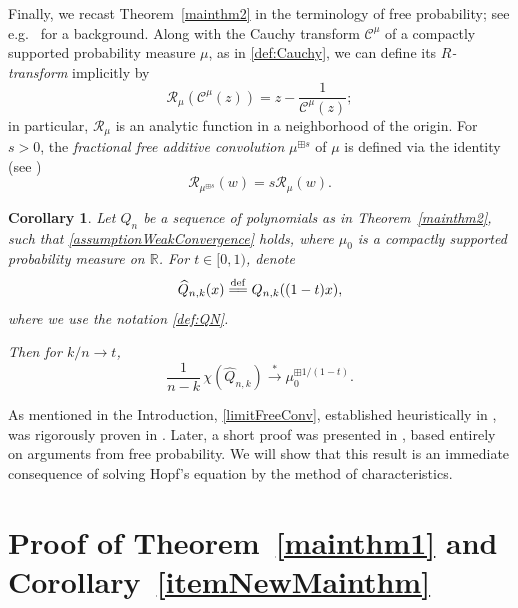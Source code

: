 \documentclass[reqno,11pt]{amsart}
\theoremstyle{plain}
\newtheorem{cor}[thm]{Corollary}
\theoremstyle{definition}
\theoremstyle{remark}
\numberwithin{equation}{section}
\numberwithin{equation}{section}
\newcommand{\R}{\mathbb{R}}
\newcommand{\isdef}{\overset{\mathrm{def}}{=\joinrel=}}
\begin{document}
Finally, we recast Theorem~\ref{mainthm2} in the terminology of free probability; see e.g.~\cite{Arizmendi21, MR4408504, MR3585560, MR2266879} for a background. Along with the Cauchy transform $\mathcal C^\mu$ of a compactly supported probability measure $\mu$, as in \eqref{def:Cauchy}, we can define its \textit{$R$-transform} implicitly by  
	\begin{equation}
	    \label{defRtransform}
 \mathcal R_\mu\left(\mathcal C^\mu(z)\right) = z-\frac{1}{\mathcal C^\mu(z)} ;
	\end{equation}
in particular, $\mathcal R_\mu$ is an analytic function in a neighborhood of the origin. For $s>0$, 
the \textit{fractional free additive convolution}  $\mu^{\boxplus s}$ of $\mu$ is defined via the identity (see \cite{ShlyakhtenkoTao21})
	\begin{equation}
	    \label{propRtransform}
	\mathcal R_{\mu^{\boxplus s}}(w) = s \mathcal R_\mu (w). 
\end{equation}
\begin{cor}  \label{thm:Steiner}
Let $Q_n$ be a sequence of polynomials as in Theorem~\ref{mainthm2}, such that \eqref{assumptionWeakConvergence} holds, where $\mu_0$ is a compactly supported probability measure on $\R$. For $t\in [0,1)$, denote
 $$
 \widehat Q_{n,k}(x) \isdef Q_{n,k}((1-t) x), 
 $$
 where we use the notation \eqref{def:QN}. 
 
Then for $k/n\to t$,
 \begin{equation} \label{limitFreeConv}
\frac{1}{n-k} \, \chi\left(\widehat  Q_{n,k} \right)  \stackrel{*}{\longrightarrow} \mu_0^{\boxplus 1/(1-t)}.
 \end{equation}
 \end{cor}
As mentioned in the Introduction, \eqref{limitFreeConv}, established heuristically in \cite{Steiner2021}, was rigorously proven in \cite{HoskinsKabluchko21}. Later, a short proof was presented in \cite{Arizmendi21}, based entirely on arguments from free probability. 
We will show that this result is an immediate consequence of solving Hopf's equation by the method of characteristics.

 
\section{Proof of Theorem~\ref{mainthm1} and Corollary~\ref{itemNewMainthm}} \label{sec:proofThm1}
\end{document}
